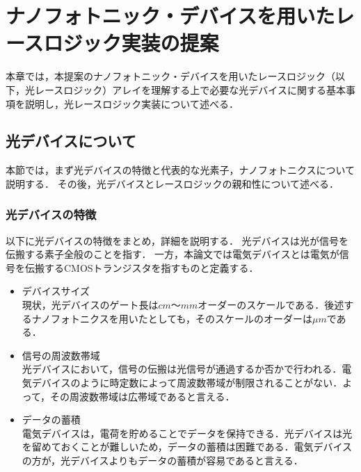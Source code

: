 \chapter{ナノフォトニック・デバイスを用いたレースロジック実装の提案}
本章では，本提案のナノフォトニック・デバイスを用いたレースロジック（以下，光レースロジック）アレイを理解する上で必要な光デバイスに関する基本事項を説明し，光レースロジック実装について述べる．

\section{光デバイスについて}
本節では，まず光デバイスの特徴と代表的な光素子，ナノフォトニクスについて説明する．
その後，光デバイスとレースロジックの親和性について述べる．

\subsection{光デバイスの特徴}
以下に光デバイスの特徴をまとめ，詳細を説明する．
光デバイスは光が信号を伝搬する素子全般のことを指す．
一方，本論文では電気デバイスとは電気が信号を伝搬するCMOSトランジスタを指すものと定義する．
\begin{itemize}
\item デバイスサイズ\\
現状，光デバイスのゲート長は$cm$〜$mm$オーダーのスケールである．後述するナノフォトニクスを用いたとしても，そのスケールのオーダーは$\mu m$である．
\item 信号の周波数帯域\\
光デバイスにおいて，信号の伝搬は光信号が通過するか否かで行われる．電気デバイスのように時定数によって周波数帯域が制限されることがない．よって，その周波数帯域は広帯域であると言える．
\item データの蓄積\\
電気デバイスは，電荷を貯めることでデータを保持できる．光デバイスは光を留めておくことが難しいため，データの蓄積は困難である．電気デバイスの方が，光デバイスよりもデータの蓄積が容易であると言える．

\end{itemize}


